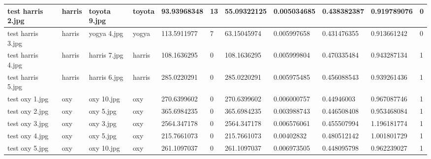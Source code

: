 \begin{landscape}
\begin{longtable}{|p{2cm}|p{1.5cm}|p{2cm}|p{1.5cm}|p{2cm}|p{1cm}|p{2cm}|p{2cm}|p{2cm}|p{2cm}|p{1cm}|}
		test harris 2.jpg    & harris           & toyota 9.jpg          & toyota                      & 93.93968348           & 13                      & 55.09322125                & 0.005034685           & 0.438382387           & 0.919789076              & 0                \\ \hline
		test harris 3.jpg    & harris           & yogya 4.jpg           & yogya                       & 113.5911977           & 7                       & 63.15045974                & 0.005997658           & 0.431476355           & 0.913661242              & 0                \\ \hline
		test harris 4.jpg    & harris           & harris 7.jpg          & harris                      & 108.1636295           & 0                       & 108.1636295                & 0.005999804           & 0.470335484           & 0.943287134              & 1                \\ \hline
		test harris 5.jpg    & harris           & harris 6.jpg          & harris                      & 285.0220291           & 0                       & 285.0220291                & 0.005975485           & 0.456088543           & 0.939261436              & 1                \\ \hline
		test oxy 1.jpg       & oxy              & oxy 10.jpg            & oxy                         & 270.6399602           & 0                       & 270.6399602                & 0.006000757           & 0.44946003            & 0.967087746              & 1                \\ \hline
		test oxy 2.jpg       & oxy              & oxy 5.jpg             & oxy                         & 365.6984235           & 0                       & 365.6984235                & 0.003988743           & 0.446508408           & 0.953468084              & 1                \\ \hline
		test oxy 3.jpg       & oxy              & oxy 3.jpg             & oxy                         & 2564.347178           & 0                       & 2564.347178                & 0.006576061           & 0.455507994           & 1.196181774              & 1                \\ \hline
		test oxy 4.jpg       & oxy              & oxy 5.jpg             & oxy                         & 215.7661073           & 0                       & 215.7661073                & 0.00402832            & 0.480512142           & 1.001801729              & 1                \\ \hline
		test oxy 5.jpg       & oxy              & oxy 10.jpg            & oxy                         & 261.1097037           & 0                       & 261.1097037                & 0.006973505           & 0.448095798           & 0.962239027              & 1                \\ \hline

\end{longtable}
\end{landscape}
